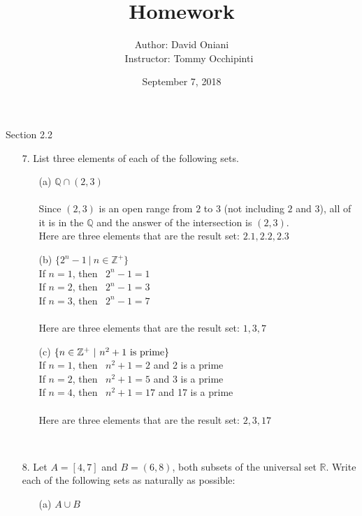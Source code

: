 \documentclass[12pt, a4paper]{article}                  %
\title{\bf{Homework \textnumero 3}}
\author{Author: David Oniani
\\
\ \ \ Instructor: Tommy Occhipinti}
\date{September 7, 2018}
\begin{document}
\maketitle

{\large Section 2.2}
\\
\begin{enumerate}
\item[7.]
List three elements of each of the following sets.

\begin{enumerate}
\item[(a)]
$\mathbb{Q} \cap (2,3)$\\\\
Since $(2,3)$ is an open range from $2$ to $3$ (not including $2$ and $3$),
all of it is in the $\mathbb{Q}$ and the answer of the intersection is $(2,3)$.\\

Here are three elements that are the result set: $2.1,2.2,2.3$
\\
\item[(b)]
$\{2^n - 1 \ \vert \ n \in \mathbb{Z^+} \}$\\

If $n=1$, then \ $2^n - 1 = 1$\\
If $n=2$, then \ $2^n - 1 = 3$\\
If $n=3$, then \ $2^n - 1 = 7$\\\\
Here are three elements that are the result set: $1,3,7$
\\
\item[(c)]
$\{n \in \mathbb{Z^+} \ \vert \ n^2 + 1 \ \textnormal{is prime} \}$\\

If $n=1$, then \ $n^2 + 1 = 2$ and 2 is a prime\\
If $n=2$, then \ $n^2 + 1 = 5$ and 3 is a prime\\
If $n=4$, then \ $n^2 + 1 = 17$ and 17 is a prime\\\\
Here are three elements that are the result set: $2,3,17$
\end{enumerate}

\

\item[8.]
Let $A = [4,7]$ and $B = (6,8)$, both subsets of the universal set
$\mathbb{R}$. Write each of the following sets as naturally as possible:
\begin{enumerate}
\item[(a)]
$A \cup B$\\


\end{enumerate}
\end{enumerate}
\end{document}
